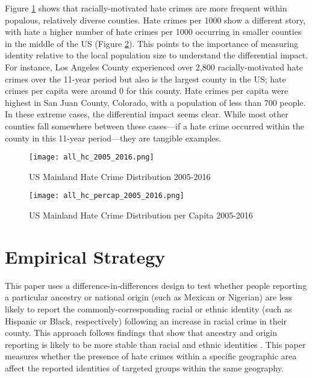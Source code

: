\documentclass{article}
\begin{document}
    Figure \ref{fig:hc_map} shows that racially-motivated hate crimes are more frequent within populous, relatively diverse counties. Hate crimes per 1000 show a different story, with hate a higher number of hate crimes per 1000 occurring in smaller counties in the middle of the US (Figure \ref{fig:hc_cap_map}). This points to the importance of measuring identity relative to the local population size to understand the differential impact. For instance, Los Angeles County experienced over 2,800 racially-motivated hate crimes over the 11-year period but also is the largest county in the US; hate crimes per capita were around 0 for this county. Hate crimes per capita were highest in San Juan County, Colorado, with a population of less than 700 people. In these extreme cases, the differential impact seems clear. While most other counties fall somewhere between these cases---if a hate crime occurred within the county in this 11-year period---they are tangible examples. 
    
    \begin{figure}[h]
        \centering
        \texttt{[image: all\_hc\_2005\_2016.png]}
        \caption{US Mainland Hate Crime Distribution 2005-2016}
        \label{fig:hc_map}
    \end{figure}

    \begin{figure}[h]
        \centering
        \texttt{[image: all\_hc\_percap\_2005\_2016.png]}
        \caption{US Mainland Hate Crime Distribution per Capita 2005-2016}
        \label{fig:hc_cap_map}
    \end{figure}
    
\section{Empirical Strategy}

    This paper uses a difference-in-differences design to test whether people reporting a particular ancestry or national origin (such as Mexican or Nigerian) are less likely to report the commonly-corresponding racial or ethnic identity (such as Hispanic or Black, respectively) following an increase in racial crime in their county. This approach follows findings that show that ancestry and origin reporting is likely to be more stable than racial and ethnic identities \cite{antman15}. This paper measures whether the presence of hate crimes within a specific geographic area affect the reported identities of targeted groups within the same geography. 
\end{document}
